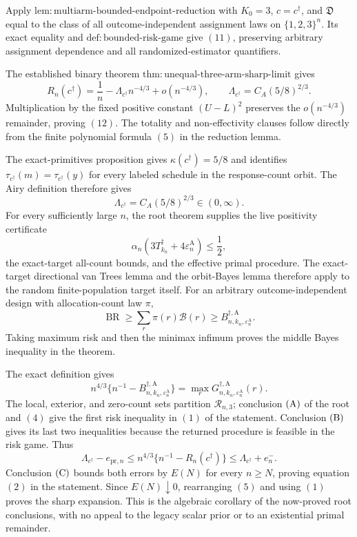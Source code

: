 Apply \(\mathrm{lem:multiarm\text{-}bounded\text{-}endpoint\text{-}reduction}\) with \(K_0=3\), \(c=c^\dagger\), and \(\mathfrak D\) equal to the class of all outcome-independent assignment laws on \(\{1,2,3\}^n\).  Its exact equality and \(\mathrm{def:bounded\text{-}risk\text{-}game}\) give \((11)\), preserving arbitrary assignment dependence and all randomized-estimator quantifiers.

The established binary theorem \(\mathrm{thm:unequal\text{-}three\text{-}arm\text{-}sharp\text{-}limit}\) gives
\[
 R_n(c^\dagger)
 =\frac1n-\Lambda_{c^\dagger}n^{-4/3}+o(n^{-4/3}),
 \qquad
 \Lambda_{c^\dagger}=C_A(5/8)^{2/3}.
\]
Multiplication by the fixed positive constant \((U-L)^2\) preserves the \(o(n^{-4/3})\) remainder, proving \((12)\).  The totality and non-effectivity clauses follow directly from the finite polynomial formula \((5)\) in the reduction lemma.

The exact-primitives proposition gives
\(\kappa(c^\dagger)=5/8\) and identifies
\(\tau_{c^\dagger}(m)=\tau_{c^\dagger}(y)\) for every labeled schedule in the response-count orbit.  The Airy definition therefore gives
\[
\Lambda_{c^\dagger}=C_A(5/8)^{2/3}\in(0,\infty).
\tag{1}
\]
For every sufficiently large \(n\), the root theorem supplies the live positivity certificate
\[
\alpha_n(3T_{k_n}^\dagger+4\varepsilon_n^{\mathrm A})\le\frac12,
\tag{2}
\]
the exact-target all-count bounds, and the effective primal procedure.  The exact-target directional van Trees lemma and the orbit-Bayes lemma therefore apply to the random finite-population target itself.  For an arbitrary outcome-independent design with allocation-count law \(\pi\),
\[
\operatorname{BR}\ge\sum_r\pi(r)\mathcal B(r)
\ge B_{n,k_n,\varepsilon_n^{\mathrm A}}^{\dagger,\mathrm A}.
\tag{3}
\]
Taking maximum risk and then the minimax infimum proves the middle Bayes inequality in the theorem.

The exact definition gives
\[
n^{4/3}\{n^{-1}-B_{n,k_n,\varepsilon_n^{\mathrm A}}^{\dagger,\mathrm A}\}
=\max_rG_{n,k_n,\varepsilon_n^{\mathrm A}}^{\dagger,\mathrm A}(r).
\tag{4}
\]
The local, exterior, and zero-count sets partition \(\mathcal R_{n,3}\); conclusion \({\rm(A)}\) of the root and \((4)\) give the first risk inequality in \((1)\) of the statement.  Conclusion \({\rm(B)}\) gives its last two inequalities because the returned procedure is feasible in the risk game.  Thus
\[
\Lambda_{c^\dagger}-e_{\mathrm{pr},n}
\le n^{4/3}\{n^{-1}-R_n(c^\dagger)\}
\le\Lambda_{c^\dagger}+e_n^-.
\tag{5}
\]
Conclusion \({\rm(C)}\) bounds both errors by \(E(N)\) for every \(n\ge N\), proving equation \((2)\) in the statement.  Since \(E(N)\downarrow0\), rearranging \((5)\) and using \((1)\) proves the sharp expansion.  This is the algebraic corollary of the now-proved root conclusions, with no appeal to the legacy scalar prior or to an existential primal remainder.

